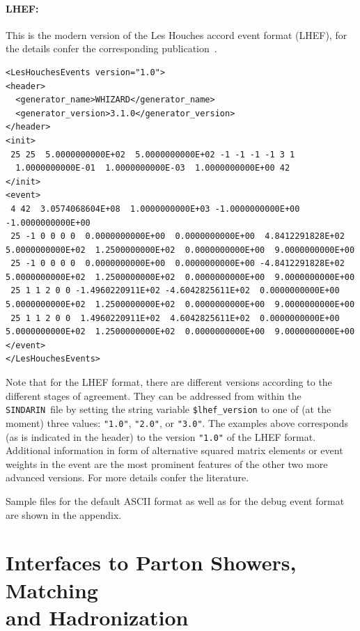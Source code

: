 \documentclass[12pt]{book}
\newcommand{\ttt}[1]{\texttt{#1}}
\newcommand{\sindarin}{\ttt{SINDARIN}}
\begin{document}
\paragraph{LHEF:}

This is the modern version of the Les Houches accord event format
(LHEF), for the details confer the corresponding publication~\cite{LHEF}.

\begin{scriptsize}
  \begin{verbatim}
<LesHouchesEvents version="1.0">
<header>
  <generator_name>WHIZARD</generator_name>
  <generator_version>3.1.0</generator_version>
</header>
<init>
 25 25  5.0000000000E+02  5.0000000000E+02 -1 -1 -1 -1 3 1
  1.0000000000E-01  1.0000000000E-03  1.0000000000E+00 42
</init>
<event>
 4 42  3.0574068604E+08  1.0000000000E+03 -1.0000000000E+00 -1.0000000000E+00
 25 -1 0 0 0 0  0.0000000000E+00  0.0000000000E+00  4.8412291828E+02  5.0000000000E+02  1.2500000000E+02  0.0000000000E+00  9.0000000000E+00
 25 -1 0 0 0 0  0.0000000000E+00  0.0000000000E+00 -4.8412291828E+02  5.0000000000E+02  1.2500000000E+02  0.0000000000E+00  9.0000000000E+00
 25 1 1 2 0 0 -1.4960220911E+02 -4.6042825611E+02  0.0000000000E+00  5.0000000000E+02  1.2500000000E+02  0.0000000000E+00  9.0000000000E+00
 25 1 1 2 0 0  1.4960220911E+02  4.6042825611E+02  0.0000000000E+00  5.0000000000E+02  1.2500000000E+02  0.0000000000E+00  9.0000000000E+00
</event>
</LesHouchesEvents>
  \end{verbatim}
\end{scriptsize}

Note that for the LHEF format, there are different versions according
to the different stages of agreement. They can be addressed from
within the \sindarin\ file by setting the string variable
\ttt{\$lhef\_version} to one of (at the moment) three values:
\ttt{"1.0"}, \ttt{"2.0"}, or \ttt{"3.0"}. The examples above
corresponds (as is indicated in the header) to the version \ttt{"1.0"}
of the LHEF format. Additional information in form of alternative
squared matrix elements or event weights in the event are the most
prominent features of the other two more advanced versions. For more
details confer the literature.

\vspace{.5cm}

Sample files for the default ASCII format as well as for the debug
event format are shown in the appendix.


\section[Interfaces to Parton Showers, Matching and
Hadronization]{Interfaces to Parton Showers, Matching\\and
  Hadronization}
\end{document}
